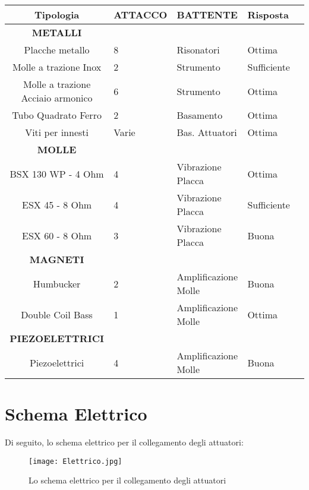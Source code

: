 \clearpage 
\small{
\begin{table}[htp]
\begin{center}

\begin{tabular}{cp{.7cm}p{.7cm}p{.7cm}p{.7cm}} \textbf{Tipologia}&\textbf{ATTACCO}&\textbf{BATTENTE}&\textbf{Risposta}\\
\hline \textbf{METALLI}\\
\hline Placche metallo&8&Risonatori&Ottima\\
\hline Molle a trazione Inox&2&Strumento&Sufficiente\\
\hline Molle a trazione Acciaio armonico&6&Strumento&Ottima\\
\hline Tubo Quadrato Ferro&2&Basamento&Ottima\\
\hline Viti per innesti&Varie&Bas. Attuatori&Ottima\\
\hline \textbf{MOLLE}\\
\hline BSX 130 WP - 4 Ohm&4&Vibrazione Placca&Ottima\\
\hline ESX 45 - 8 Ohm&4&Vibrazione Placca&Sufficiente\\
\hline ESX 60 - 8 Ohm&3&Vibrazione Placca&Buona\\
\hline \textbf{MAGNETI}\\
\hline Humbucker&2&Amplificazione Molle&Buona\\
\hline Double Coil Bass&1&Amplificazione Molle&Ottima\\
\hline \textbf{PIEZOELETTRICI} \\
\hline Piezoelettrici&4&Amplificazione Molle&Buona\\
\hline
\end{tabular}

\end{center}
\label{default}
\end{table}%
}
\clearpage


\section{Schema Elettrico}
Di seguito, lo schema elettrico per il collegamento degli attuatori:

\begin{figure}[htbp]
\begin{center}
\texttt{[image: Elettrico.jpg]}
\caption{Lo schema elettrico per il collegamento degli attuatori}
\label{default}
\end{center}
\end{figure}
